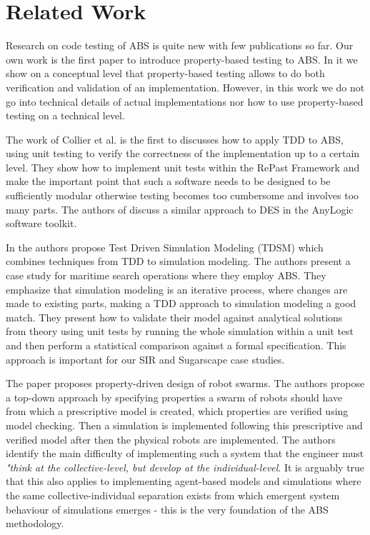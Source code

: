 \section{Related Work}
\label{sec:related}

Research on code testing of ABS is quite new with few publications so far. Our own work \cite{thaler_show_2019} is the first paper to introduce property-based testing to ABS. In it we show on a conceptual level that property-based testing allows to do both verification and validation of an implementation. However, in this work we do not go into technical details of actual implementations nor how to use property-based testing on a technical level.

The work of Collier et al. \cite{collier_test-driven_2013} is the first to discusses how to apply TDD to ABS, using unit testing \cite{beck_test_2002} to verify the correctness of the implementation up to a certain level. They show how to implement unit tests within the RePast Framework  and make the important point that such a software needs to be designed to be sufficiently modular otherwise testing becomes too cumbersome and involves too many parts. The authors of \cite{asta_investigation_2014} discuss a similar approach to DES in the AnyLogic software toolkit. 

In \cite{onggo_test-driven_2016} the authors propose Test Driven Simulation Modeling (TDSM) which combines techniques from TDD to simulation modeling. The authors present a case study for maritime search operations where they employ ABS. They emphasize that simulation modeling is an iterative process, where changes are made to existing parts, making a TDD approach to simulation modeling a good match. They present how to validate their model against analytical solutions from theory using unit tests by running the whole simulation within a unit test and then perform a statistical comparison against a formal specification. This approach is important for our SIR and Sugarscape case studies.

The paper \cite{brambilla_property-driven_2012} proposes property-driven design of robot swarms. The authors propose a top-down approach by specifying properties a swarm of robots should have from which a prescriptive model is created, which properties are verified using model checking. Then a simulation is implemented following this prescriptive and verified model after then the physical robots are implemented. The authors identify the main difficulty of implementing such a system that the engineer must \textit{"think at the collective-level, but develop at the individual-level}. It is arguably true that this also applies to implementing agent-based models and simulations where the same collective-individual separation exists from which emergent system behaviour of simulations emerges - this is the very foundation of the ABS methodology.

